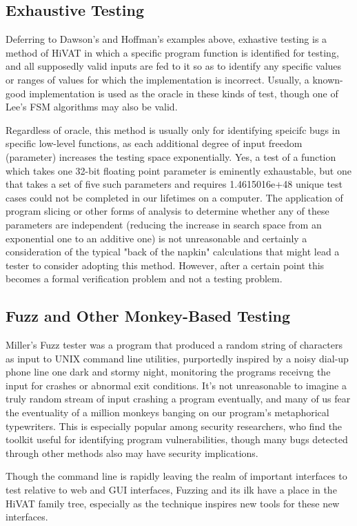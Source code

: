 \subsection{Exhaustive Testing}
Deferring to Dawson's and Hoffman's examples above, exhastive testing is a method of HiVAT in which a specific program function is identified for testing, and all supposedly valid inputs are fed to it so as to identify any specific values or ranges of values for which the implementation is incorrect. Usually, a known-good implementation is used as the oracle in these kinds of test, though one of Lee's FSM algorithms may also be valid.

Regardless of oracle, this method is usually only for identifying speicifc bugs in specific low-level functions, as each additional degree of input freedom (parameter) increases the testing space exponentially. Yes, a test of a function which takes one 32-bit floating point parameter is eminently exhaustable, but one that takes a set of five such parameters and requires 1.4615016e+48 unique test cases could not be completed in our lifetimes on a computer. The application of program slicing or other forms of analysis to determine whether any of these parameters are independent (reducing the increase in search space from an exponential one to an additive one) is not unreasonable and certainly a consideration of the typical "back of the napkin" calculations that might lead a tester to consider adopting this method. However, after a certain point this becomes a formal verification problem and not a testing problem.

\subsection{Fuzz and Other Monkey-Based Testing}
 Miller's Fuzz tester was a program that produced a random string of characters as input to UNIX command line utilities, purportedly inspired by a noisy dial-up phone line one dark and stormy night, monitoring the programs receivng the input for crashes or abnormal exit conditions. It's not unreasonable to imagine a truly random stream of input crashing a program eventually, and many of us fear the eventuality of a million monkeys banging on our program's metaphorical typewriters. This is especially popular among security researchers, who find the toolkit useful for identifying program vulnerabilities, though many bugs detected through other methods also may have security implications.

 Though the command line is rapidly leaving the realm of important interfaces to test relative to web and GUI interfaces, Fuzzing and its ilk have a place in the HiVAT family tree, especially as the technique inspires new tools for these new interfaces.

